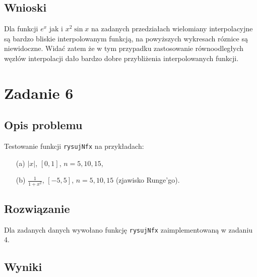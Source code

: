 \documentclass[12pt, a4paper]{article}
\begin{document}
\newpage

\subsection{Wnioski}
Dla funkcji $e^x$ jak i $x^2\sin{x}$ na zadanych przedziałach wielomiany interpolacyjne są bardzo bliskie interpolowanym funkcją, na powyższych  wykresach róznice są niewidoczne. Widać zatem że w tym przypadku zastosowanie równoodległych węzłów interpolacji dało bardzo dobre przybliżenia interpolowanych funkcji.



\section{Zadanie 6}
\subsection{Opis problemu}
Testowanie funkcji \texttt{rysujNfx} na przykładach:
\begin{itemize}
    \item[(a)] $|x|$, $[0, 1]$, $n = 5, 10, 15$,
    \item[(b)] $\frac{1}{1 + x^{2}}$, $[-5, 5]$, $n = 5, 10, 15$ (zjawisko Runge'go).
\end{itemize}


\subsection{Rozwiązanie}
Dla zadanych danych wywołano funkcję \texttt{rysujNfx} zaimplementowaną w zadaniu 4.

\newpage

\subsection{Wyniki}
\end{document}
